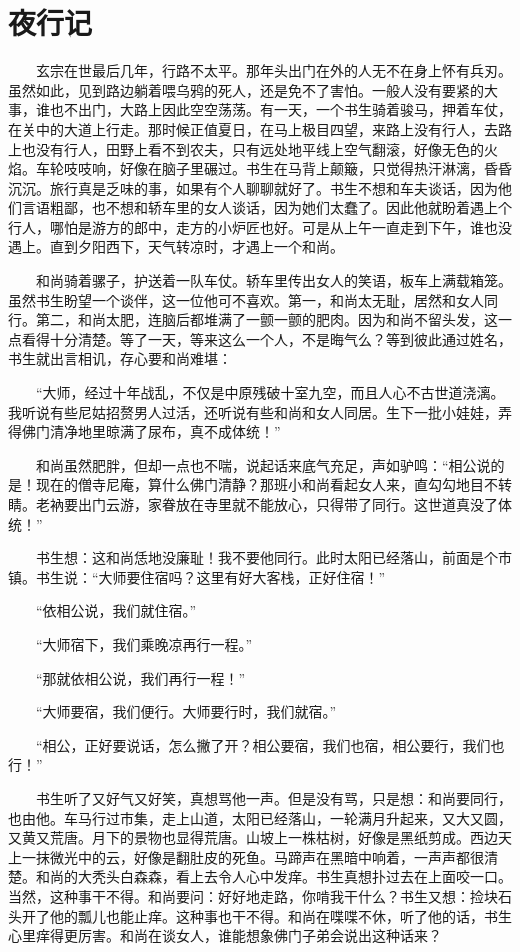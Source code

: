 \chapter{夜行记}

　　玄宗在世最后几年，行路不太平。那年头出门在外的人无不在身上怀有兵刃。虽然如此，见到路边躺着喂乌鸦的死人，还是免不了害怕。一般人没有要紧的大事，谁也不出门，大路上因此空空荡荡。有一天，一个书生骑着骏马，押着车仗，在关中的大道上行走。那时候正值夏日，在马上极目四望，来路上没有行人，去路上也没有行人，田野上看不到农夫，只有远处地平线上空气翻滚，好像无色的火焰。车轮吱吱响，好像在脑子里碾过。书生在马背上颠簸，只觉得热汗淋漓，昏昏沉沉。旅行真是乏味的事，如果有个人聊聊就好了。书生不想和车夫谈话，因为他们言语粗鄙，也不想和轿车里的女人谈话，因为她们太蠢了。因此他就盼着遇上个行人，哪怕是游方的郎中，走方的小炉匠也好。可是从上午一直走到下午，谁也没遇上。直到夕阳西下，天气转凉时，才遇上一个和尚。 

　　和尚骑着骡子，护送着一队车仗。轿车里传出女人的笑语，板车上满载箱笼。虽然书生盼望一个谈伴，这一位他可不喜欢。第一，和尚太无耻，居然和女人同行。第二，和尚太肥，连脑后都堆满了一颤一颤的肥肉。因为和尚不留头发，这一点看得十分清楚。等了一天，等来这么一个人，不是晦气么？等到彼此通过姓名，书生就出言相讥，存心要和尚难堪： 

　　“大师，经过十年战乱，不仅是中原残破十室九空，而且人心不古世道浇漓。我听说有些尼姑招赘男人过活，还听说有些和尚和女人同居。生下一批小娃娃，弄得佛门清净地里晾满了尿布，真不成体统！” 

　　和尚虽然肥胖，但却一点也不喘，说起话来底气充足，声如驴鸣：“相公说的是！现在的僧寺尼庵，算什么佛门清静？那班小和尚看起女人来，直勾勾地目不转睛。老衲要出门云游，家眷放在寺里就不能放心，只得带了同行。这世道真没了体统！” 

　　书生想：这和尚恁地没廉耻！我不要他同行。此时太阳已经落山，前面是个市镇。书生说：“大师要住宿吗？这里有好大客栈，正好住宿！” 

　　“依相公说，我们就住宿。” 

　　“大师宿下，我们乘晚凉再行一程。” 

　　“那就依相公说，我们再行一程！” 

　　“大师要宿，我们便行。大师要行时，我们就宿。” 

　　“相公，正好要说话，怎么撇了开？相公要宿，我们也宿，相公要行，我们也行！” 

　　书生听了又好气又好笑，真想骂他一声。但是没有骂，只是想：和尚要同行，也由他。车马行过市集，走上山道，太阳已经落山，一轮满月升起来，又大又圆，又黄又荒唐。月下的景物也显得荒唐。山坡上一株枯树，好像是黑纸剪成。西边天上一抹微光中的云，好像是翻肚皮的死鱼。马蹄声在黑暗中响着，一声声都很清楚。和尚的大秃头白森森，看上去令人心中发痒。书生真想扑过去在上面咬一口。当然，这种事干不得。和尚要问：好好地走路，你啃我干什么？书生又想：捡块石头开了他的瓢儿也能止痒。这种事也干不得。和尚在喋喋不休，听了他的话，书生心里痒得更厉害。和尚在谈女人，谁能想象佛门子弟会说出这种话来？ 

